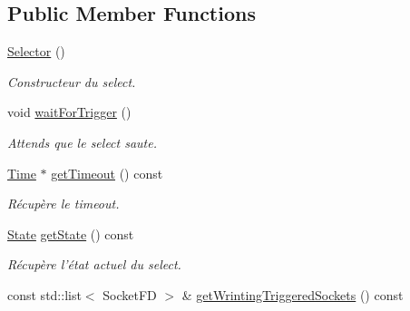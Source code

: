 \subsection*{Public Member Functions}
\begin{DoxyCompactItemize}
\item 
\hypertarget{classmognetwork_1_1_selector_ac2dc59256b3b676a6c04102f5ea5515a}{\hyperlink{classmognetwork_1_1_selector_ac2dc59256b3b676a6c04102f5ea5515a}{Selector} ()}\label{classmognetwork_1_1_selector_ac2dc59256b3b676a6c04102f5ea5515a}

\begin{DoxyCompactList}\small\item\em Constructeur du select. \end{DoxyCompactList}\item 
\hypertarget{classmognetwork_1_1_selector_aba14d0165c8b6408e75a8a7db3cbffb7}{void \hyperlink{classmognetwork_1_1_selector_aba14d0165c8b6408e75a8a7db3cbffb7}{wait\-For\-Trigger} ()}\label{classmognetwork_1_1_selector_aba14d0165c8b6408e75a8a7db3cbffb7}

\begin{DoxyCompactList}\small\item\em Attends que le select saute. \end{DoxyCompactList}\item 
\hyperlink{_selector_8hh_af47ac292ef7224cf549b944d138ba4ae}{Time} $\ast$ \hyperlink{classmognetwork_1_1_selector_ae1cb38fe53e4313751062277b39fbfd5}{get\-Timeout} () const 
\begin{DoxyCompactList}\small\item\em Récupère le timeout. \end{DoxyCompactList}\item 
\hyperlink{classmognetwork_1_1_selector_a51d709c3579bf32265d68d4313df5794}{State} \hyperlink{classmognetwork_1_1_selector_aab8261de074ef927dfe62bb9ddaafb93}{get\-State} () const 
\begin{DoxyCompactList}\small\item\em Récupère l'état actuel du select. \end{DoxyCompactList}\item 
\hypertarget{classmognetwork_1_1_selector_a4facfad643b0880b63a8060c8fa17fda}{const std\-::list$<$ Socket\-F\-D $>$ \& \hyperlink{classmognetwork_1_1_selector_a4facfad643b0880b63a8060c8fa17fda}{get\-Wrinting\-Triggered\-Sockets} () const }\label{classmognetwork_1_1_selector_a4facfad643b0880b63a8060c8fa17fda}


\end{DoxyCompactItemize}
